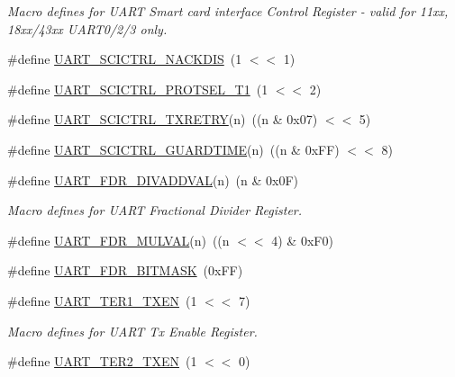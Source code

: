 \begin{DoxyCompactItemize}
\begin{DoxyCompactList}\small\item\em Macro defines for U\+A\+RT Smart card interface Control Register -\/ valid for 11xx, 18xx/43xx U\+A\+R\+T0/2/3 only. \end{DoxyCompactList}\item 
\#define \hyperlink{group___u_a_r_t__18_x_x__43_x_x_ga49ad93a6f4c7175b6111716e329bfb36}{U\+A\+R\+T\+\_\+\+S\+C\+I\+C\+T\+R\+L\+\_\+\+N\+A\+C\+K\+D\+IS}~(1 $<$$<$ 1)
\item 
\#define \hyperlink{group___u_a_r_t__18_x_x__43_x_x_ga48e869912cabe85bef5d11cda3b773f4}{U\+A\+R\+T\+\_\+\+S\+C\+I\+C\+T\+R\+L\+\_\+\+P\+R\+O\+T\+S\+E\+L\+\_\+\+T1}~(1 $<$$<$ 2)
\item 
\#define \hyperlink{group___u_a_r_t__18_x_x__43_x_x_gadd17c8f0f6239c42d18e4af35ee3effc}{U\+A\+R\+T\+\_\+\+S\+C\+I\+C\+T\+R\+L\+\_\+\+T\+X\+R\+E\+T\+RY}(n)~((n \& 0x07) $<$$<$ 5)
\item 
\#define \hyperlink{group___u_a_r_t__18_x_x__43_x_x_gac74665d22f8c0c1b18f46a65bbe5031a}{U\+A\+R\+T\+\_\+\+S\+C\+I\+C\+T\+R\+L\+\_\+\+G\+U\+A\+R\+D\+T\+I\+ME}(n)~((n \& 0x\+F\+F) $<$$<$ 8)
\item 
\#define \hyperlink{group___u_a_r_t__18_x_x__43_x_x_ga08ae53568f606c894a5ffd764cef6171}{U\+A\+R\+T\+\_\+\+F\+D\+R\+\_\+\+D\+I\+V\+A\+D\+D\+V\+AL}(n)~(n \& 0x0\+F)
\begin{DoxyCompactList}\small\item\em Macro defines for U\+A\+RT Fractional Divider Register. \end{DoxyCompactList}\item 
\#define \hyperlink{group___u_a_r_t__18_x_x__43_x_x_ga728a262cba31ffd0d7b4fb172f6dead7}{U\+A\+R\+T\+\_\+\+F\+D\+R\+\_\+\+M\+U\+L\+V\+AL}(n)~((n $<$$<$ 4) \& 0x\+F0)
\item 
\#define \hyperlink{group___u_a_r_t__18_x_x__43_x_x_ga61a8f74c3fc22574793c6218b90fec50}{U\+A\+R\+T\+\_\+\+F\+D\+R\+\_\+\+B\+I\+T\+M\+A\+SK}~(0x\+F\+F)
\item 
\#define \hyperlink{group___u_a_r_t__18_x_x__43_x_x_ga78f0ee43aa0e7c030a3cfa1dca5ff072}{U\+A\+R\+T\+\_\+\+T\+E\+R1\+\_\+\+T\+X\+EN}~(1 $<$$<$ 7)
\begin{DoxyCompactList}\small\item\em Macro defines for U\+A\+RT Tx Enable Register. \end{DoxyCompactList}\item 
\#define \hyperlink{group___u_a_r_t__18_x_x__43_x_x_gac9ec0de9b40d5d9dd9fed4836a31122f}{U\+A\+R\+T\+\_\+\+T\+E\+R2\+\_\+\+T\+X\+EN}~(1 $<$$<$ 0)
$$
\end{DoxyCompactItemize}
